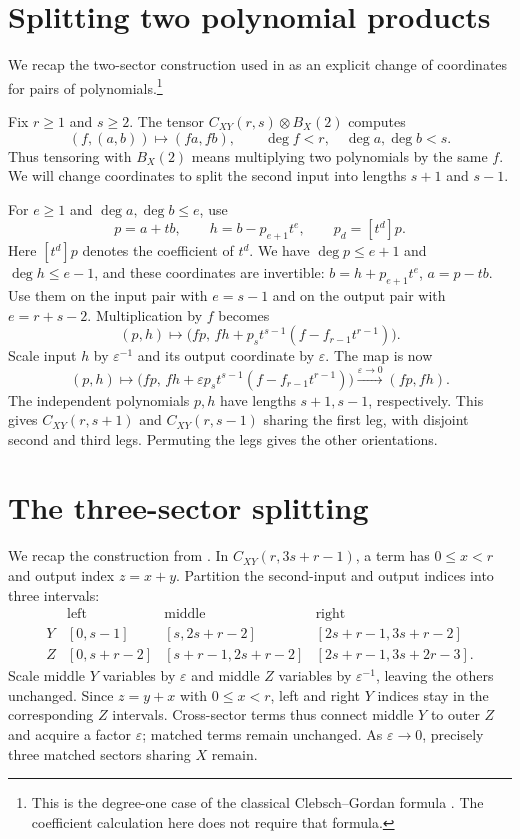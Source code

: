 \documentclass[11pt]{article}
\begin{document}
\section{Splitting two polynomial products}\label{app:determinant-filtration}

We recap the two-sector construction used in
\cite[Lemma~4.1]{openai-2026-matrix-nine-fourths} as an explicit change of
coordinates for pairs of polynomials.\footnote{This is the degree-one case
of the classical Clebsch--Gordan formula
\cite[Theorem~2.6.3, pp.~56--57 of the author version]{kowalski-2014-representation-theory}.
The coefficient calculation here does not require that formula.}

Fix $r\ge1$ and $s\ge2$. The tensor $C_{XY}(r,s)\otimes B_X(2)$
computes
\[
 (f,(a,b))\longmapsto(fa,fb),\qquad
 \deg f<r,\quad\deg a,\deg b<s.
\]
Thus tensoring with $B_X(2)$ means multiplying two polynomials by the
same $f$. We will change coordinates to split the second input into
lengths $s+1$ and $s-1$.

For $e\ge1$ and $\deg a,\deg b\le e$, use
\[
 p=a+tb,\qquad h=b-p_{e+1}t^e,\qquad p_d=[t^d]p.
\]
Here $[t^d]p$ denotes the coefficient of $t^d$. We have
$\deg p\le e+1$ and $\deg h\le e-1$, and these coordinates are invertible:
$b=h+p_{e+1}t^e$, $a=p-tb$.
Use them on the input pair with $e=s-1$ and on the output pair with
$e=r+s-2$. Multiplication by $f$ becomes
\[
 (p,h)\longmapsto
 \bigl(fp,\,fh+p_s t^{s-1}(f-f_{r-1}t^{r-1})\bigr).
\]
Scale input $h$ by $\varepsilon^{-1}$ and its output coordinate by
$\varepsilon$. The map is now
\[
 (p,h)\longmapsto
 \bigl(fp,\,fh+\varepsilon p_s t^{s-1}(f-f_{r-1}t^{r-1})\bigr)
 \xrightarrow{\varepsilon\to0}(fp,fh).
\]
The independent polynomials $p,h$ have lengths $s+1,s-1$, respectively.
This gives $C_{XY}(r,s+1)$ and $C_{XY}(r,s-1)$ sharing the first leg,
with disjoint second and third legs. Permuting the legs gives the
other orientations.

\section{The three-sector splitting}\label{app:tripling}

We recap the construction from \cite[Lemma~4.2]{openai-2026-matrix-nine-fourths}.
In $C_{XY}(r,3s+r-1)$, a term has $0\le x<r$ and output index $z=x+y$.
Partition the second-input and output indices into three intervals:
\[
\begin{array}{c|ccc}
 &\text{left}&\text{middle}&\text{right}\\ \hline
 Y &[0,s-1]&[s,2s+r-2]&[2s+r-1,3s+r-2]\\
 Z &[0,s+r-2]&[s+r-1,2s+r-2]&[2s+r-1,3s+2r-3].
\end{array}
\]
Scale middle $Y$ variables by $\varepsilon$ and middle $Z$ variables
by $\varepsilon^{-1}$, leaving the others unchanged.
Since $z=y+x$ with $0\le x<r$, left and right $Y$ indices stay
in the corresponding $Z$ intervals. Cross-sector terms thus connect
middle $Y$ to outer $Z$ and acquire a factor $\varepsilon$;
matched terms remain unchanged. As $\varepsilon\to0$, precisely
three matched sectors sharing $X$ remain.
\end{document}
